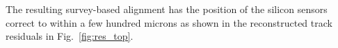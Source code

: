 The resulting survey-based alignment has the position of the silicon sensors correct to within a few hundred 
microns as shown in the reconstructed track residuals in Fig.~\ref{fig:res_top}. 

